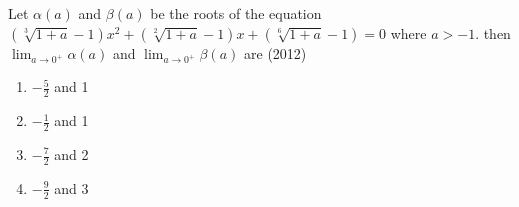         \item Let $\alpha(a)$ and $\beta(a)$ be the roots of the equation $(\sqrt[3]{1+a}-1)x^2+(\sqrt[2]{1+a}-1)x+(\sqrt[6]{1+a}-1)=0$ where $a>-1$. then $\lim_{a \to 0^+}{\alpha(a)}$ and $\lim_{a \to 0^
		+}{\beta(a)}$ are \hfill{(2012)}
		\begin{enumerate}
			\item $-\frac{5}{2}$ and 1
			\item $-\frac{1}{2}$ and 1
			\item $-\frac{7}{2}$ and 2
			\item $-\frac{9}{2}$ and 3 
		\end{enumerate}
